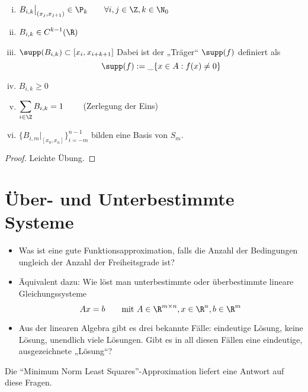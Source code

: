 \documentclass[11pt]{scrbook}
\begin{document}
\begin{st}[Eigenschaften]
	\label{1.36}
	\begin{enumerate}[i)]
		\item
			$\displaystyle B_{i,k}\big|_{(x_j,x_{j+1})} \in \P_k \qquad \forall i,j\in \Z, k\in \N_0$
		\item
			$\displaystyle B_{i,k} \in C^{k-1}(\R)$
		\item
			$\displaystyle \supp (B_{i,k}) \subset [x_i,x_{i+k+1}]$
			Dabei ist der „Träger“ $\supp (f)$ definiert als
			\[
				\supp(f) := \_{\{x\in A : f(x) \neq 0\}}
			\]
		\item
			$\displaystyle B_{i,k} \ge 0$
		\item
			$\displaystyle \sum_{i\in \Z} B_{i,k} = 1 \qquad$ (Zerlegung der Eins)
		\item
			$\displaystyle \{B_{i,m}\big|_{[x_0,x_n]}\}_{i=-m}^{n-1}$ bilden eine Basis von $S_m$.
	\end{enumerate}
	\begin{proof}
		Leichte Übung.
	\end{proof}
\end{st}


\section{Über- und Unterbestimmte Systeme}


\begin{itemize}
	\item
		Was ist eine gute Funktionsapproximation, falls die Anzahl der Bedingungen ungleich der Anzahl der Freiheitsgrade ist?
	\item
		Äquivalent dazu: Wie löst man unterbestimmte oder überbestimmte lineare Gleichungssysteme
		\[
			Ax=b \qquad \text{mit } A\in \R^{m\times n}, x\in \R^n, b\in \R^m
		\]
	\item
		Aus der linearen Algebra gibt es drei bekannte Fälle: eindeutige Lösung, keine Lösung, unendlich viele Lösungen.
		Gibt es in all diesen Fällen eine eindeutige, ausgezeichnete „Lösung“?
\end{itemize}

Die “Minimum Norm Least Squares”-Approximation liefert eine Antwort auf diese Fragen.
\end{document}
